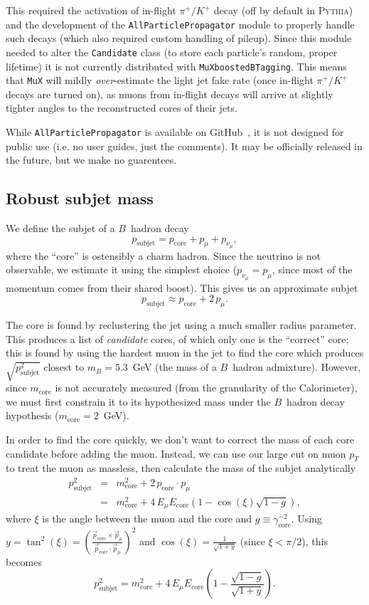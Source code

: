 \documentclass[10pt]{article}
\newcommand{\muXmodFull}{\texttt{MuXboostedBTagging}}
\newcommand{\muXmod}{\texttt{MuX}}
\newcommand{\pT}{p_{T}^{}}
\newcommand{\pSubjet}[1][] {p_{\mathrm{subjet}}^{#1}}
\newcommand{\pCore}[1][]   {p_{\mathrm{core}}^{#1}}
\newcommand{\pCoreV}       {\vec{p}_{\mathrm{core}}^{}}
\newcommand{\pMu}[1][]     {p_{\mu}^{#1}}
\newcommand{\pMuV}       {\vec{p}_{\mu}^{}}
\newcommand{\pNu}[1][]     {p_{\nu_{\mu}}^{#1}}
\newcommand{\mB}             {m_{B}^{}}
\newcommand{\mCore}[1][]     {m_{\mathrm{core}}^{#1}}
\newcommand{\ECore}[1][]     {E_{\mathrm{core}}^{#1}}
\newcommand{\gammaCore}[1][] {\gamma_{\mathrm{core}}^{#1}}
\newcommand{\EMu}[1][]       {E_{\mu}^{#1}}
\begin{document}
This required the activation of in-flight $\pi^{+}/K^{+}$ decay (off by
default in \textsc{Pythia}) and the development of the
\texttt{AllParticlePropagator} module to properly handle such decays (which also
required custom handling of pileup). Since this module needed to alter the
\texttt{Candidate} class (to store each particle's random, proper lifetime) it
is not currently distributed with {\muXmodFull}. This means that {\muXmod} will
mildly \emph{over}-estimate the light jet fake rate (once in-flight
$\pi^{+}/K^{+}$ decays are turned on), as muons from in-flight decays will
arrive at slightly tighter angles to the reconstructed cores of their jets.

While \texttt{AllParticlePropagator} is available on
GitHub~\cite{Pedersen:myDelphes}, it is not designed for public use (i.e. no
user guides, just the comments). It may be officially released in the
future, but we make no guarentees.

\subsection{Robust subjet mass}

We define the subjet of a $B$~hadron decay
%
\begin{equation}
\pSubjet=\pCore+\pMu+\pNu,
\end{equation}
%
where the ``core'' is ostensibly a charm hadron. 
Since the neutrino is not observable, we estimate it using the 
simplest choice ($\pNu=\pMu$, since most of the momentum comes from
their shared boost). This gives us an approximate subjet
%
\begin{equation}
\pSubjet\approx\pCore+2\,\pMu.
\end{equation}
%

The core is found by reclustering the jet using a much smaller radius 
parameter. This produces a list of \emph{candidate} cores, of which only
one is the ``correct'' core; this is found by using the hardest muon in 
the jet to find the core which produces $\sqrt{\pSubjet[2]}$ closest to 
$\mB=5.3$~GeV (the mass of a $B$~hadron admixture). 
However, since $\mCore$ is not accurately measured 
(from the granularity of the Calorimeter), we must first constrain it to its 
hypothesized mass under the $B$~hadron decay hypothesis ($\mCore=2$~GeV).

In order to find the core quickly, we don't want to correct the mass 
of each core candidate before adding the muon. Instead, we can use our
large cut on muon $\pT$ to treat the muon as massless, then calculate
the mass of the subjet analytically
%
\begin{eqnarray}
\pSubjet[2] & = & \mCore[2]+2\,\pCore\cdot\pMu \nonumber \\
& = & \mCore[2]+4\,\EMu\ECore(1-\cos(\xi)\sqrt{1-g}),
\end{eqnarray}
%
where $\xi$ is the angle between the muon and the core and $g\equiv\gammaCore[-2]$.
Using $y=\tan^{2}(\xi)=\left(\frac{\pCoreV\times\pMuV}{\pCoreV\cdot\pMuV}\right)^2$
and $\cos(\xi)=\frac{1}{\sqrt{1+y}}$ (since $\xi<\pi/2$), this becomes
%
\begin{equation}
\pSubjet[2]=\mCore[2]+4\,\EMu\ECore(1-\frac{\sqrt{1-g}}{\sqrt{1+y}}).
\end{equation}
%
\end{document}
